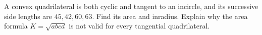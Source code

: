 A convex quadrilateral is both cyclic and tangent to an incircle, and its successive side lengths are $45,42,60,63$. Find its area and inradius. Explain why the area formula $K=\sqrt{abcd}$ is not valid for every tangential quadrilateral.
